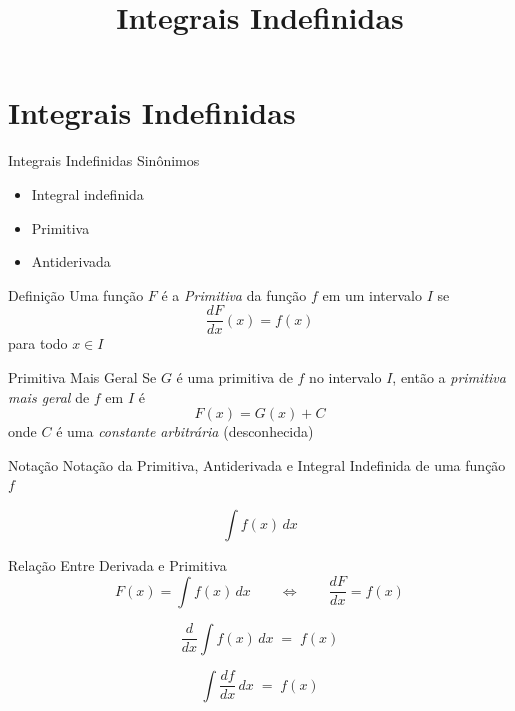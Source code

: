 \documentclass[fleqn,utf8,aspectratio=169,12pt]{beamer}
\title{Integrais Indefinidas}
\begin{document}
\addtitle

\section{Integrais Indefinidas}

\begin{frame}{Integrais Indefinidas}
  Sinônimos
  \begin{itemize}[<+->]
    \item Integral indefinida
    \item Primitiva
    \item Antiderivada
  \end{itemize}
\end{frame}

\begin{frame}{Definição}
  Uma função $F$ é a \emph{Primitiva} da função $f$
  \pause
  em um intervalo $I$
  \pause
  se
  \[
    \frac{dF}{dx}(x) = f(x)
  \]
  \pause
  para todo $x\in I$
\end{frame}

\begin{frame}{Primitiva Mais Geral}
  Se $G$ é uma primitiva de $f$ no intervalo $I$,
  \pause
  então a \emph{primitiva mais geral} de $f$ em $I$
  \pause
  é
  \[
    F(x) = G(x) + C
  \]
  \pause
  onde $C$ é uma \emph{constante arbitrária}
  \pause
  (desconhecida)
\end{frame}

\begin{frame}{Notação}
  Notação da Primitiva, Antiderivada e Integral Indefinida de uma função $f$

  \[
    \int f(x) \, dx
  \]
\end{frame}

\begin{frame}{Relação Entre Derivada e Primitiva}
  \[
    F(x) = \int f(x)\,dx
    \qquad \Leftrightarrow \qquad
    \frac{dF}{dx} = f(x)
  \]

  \pause
  \[
    \frac{d}{dx} \int f(x)\,dx \;=\; f(x)
  \]

  \pause
  \[
    \int \frac{df}{dx} \,dx \;=\; f(x)
  \]
\end{frame}
\end{document}
